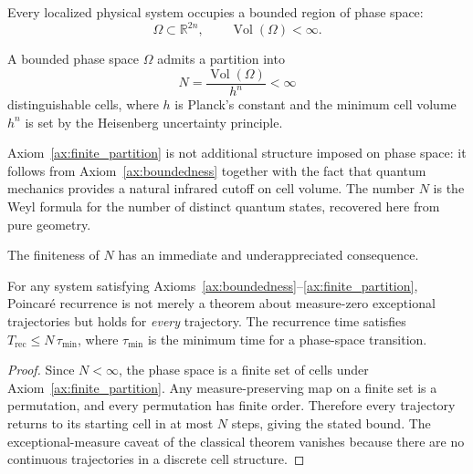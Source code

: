 \begin{axiom}[Boundedness]
\label{ax:boundedness}
Every localized physical system occupies a bounded region of phase space:
\begin{equation}
  \Omega \subset \mathbb{R}^{2n}, \qquad \operatorname{Vol}(\Omega) < \infty.
\end{equation}
\end{axiom}

\begin{axiom}
\label{ax:finite_partition}
A bounded phase space $\Omega$ admits a partition into
\begin{equation}
  N = \frac{\operatorname{Vol}(\Omega)}{h^n} < \infty
\end{equation}
distinguishable cells, where $h$ is Planck's constant and the minimum cell
volume $h^n$ is set by the Heisenberg uncertainty principle.
\end{axiom}

\begin{remark}
Axiom~\ref{ax:finite_partition} is not additional structure imposed on
phase space: it follows from Axiom~\ref{ax:boundedness} together with the
fact that quantum mechanics provides a natural infrared cutoff on cell
volume. The number $N$ is the Weyl formula for the number of distinct
quantum states, recovered here from pure geometry.
\end{remark}

The finiteness of $N$ has an immediate and underappreciated consequence.

\begin{proposition}
\label{prop:poincare}
For any system satisfying Axioms~\ref{ax:boundedness}--\ref{ax:finite_partition},
Poincar\'{e} recurrence is not merely a theorem about measure-zero exceptional
trajectories but holds for \emph{every} trajectory. The recurrence time satisfies
$T_{\mathrm{rec}} \leq N \, \tau_{\min}$, where $\tau_{\min}$ is the minimum
time for a phase-space transition.
\end{proposition}

\begin{proof}
Since $N < \infty$, the phase space is a finite set of cells under
Axiom~\ref{ax:finite_partition}. Any measure-preserving map on a finite set
is a permutation, and every permutation has finite order. Therefore every
trajectory returns to its starting cell in at most $N$ steps, giving the
stated bound. The exceptional-measure caveat of the classical theorem vanishes
because there are no continuous trajectories in a discrete cell structure.
\end{proof}

